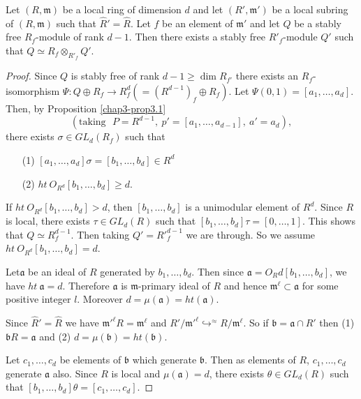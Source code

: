 \begin{proposition}\label{chap3-prop3.3}
Let $(R,\mathfrak{m})$ be a local ring of dimension $d$ and let
$(R',\mathfrak{m}')$ be a local subring of $(R,\mathfrak{m})$ such
that $\widehat{R}'=\widehat{R}$. Let $f$ be an element of
$\mathfrak{m}'$ and let $Q$ be a stably free $R_{f}$-module of rank
$d-1$. Then there exists a stably free $R'_{f}$-module $Q'$ such that
$Q\simeq R_{f}\otimes_{R'_{f}}Q'$. 
\end{proposition}

\begin{proof}
Since $Q$ is stably free of rank $d-1\geq \dim R_{f'}$ there exists an
$R_{f}$-isomorphism $\Psi:Q\oplus R_{f}\to
R^{d}_{f}(=(R^{d-1})_{f}\oplus R_{f})$. Let
$\Psi(0,1)=[a_{1},\ldots,a_{d}]$. Then, by
Proposition \ref{chap3-prop3.1}
$$ 
(\text{taking~ } P=R^{d-1}, \ 
p'=[a_{1},\ldots,a_{d-1}], \ a'=a_{d}),
$$ 
there exists $\sigma\in
GL_{d}(R_{f})$ such that
\begin{itemize}
\item[(1)] $[a_{1},\ldots,a_{d}]\sigma=[b_{1},\ldots,b_{d}]\in R^{d}$

\item[(2)] $ht\ O_{R^{d}}[b_{1},\ldots,b_{d}]\geq d$.
\end{itemize}
If $ht\ O_{R^{d}}[b_{1},\ldots,b_{d}]>d$, then $[b_{1},\ldots,b_{d}]$
is a unimodular element of $R^{d}$. Since $R$ is local, there exists
$\tau\in GL_{d}(R)$ such that
$[b_{1},\ldots,b_{d}]\tau=[0,\ldots,1]$. This shows that $Q\simeq
R^{d-1}_{f}$. Then taking $Q'={R'}^{d-1}_{f}$ we are through. So we
assume $ht\ O_{R^{d}}[b_{1},\ldots,b_{d}]=d$.

Let\pageoriginale $\mathfrak{a}$ be an ideal of $R$ generated by
$b_{1},\ldots,b_{d}$. Then since
$\mathfrak{a}=O_{R}d[b_{1},\ldots,b_{d}]$, we have
$ht\ \mathfrak{a}=d$. Therefore $\mathfrak{a}$ is
$\mathfrak{m}$-primary ideal of $R$ and hence
$\mathfrak{m}^{\ell}\subset \mathfrak{a}$ for some positive integer
$l$. Moreover $d=\mu(\mathfrak{a})=ht(\mathfrak{a})$. 

Since $\widehat{R}'=\widehat{R}$ we have
${\mathfrak{m}'}^{\ell}R=\mathfrak{m}^{\ell}$ and
$R'/{\mathfrak{m}'}^{\ell}{\displaystyle{\mathop{\hookrightarrow}^{\approx}}}
R/\mathfrak{m}^{\ell}$. So if $\mathfrak{b}=\mathfrak{a}\cap R'$ then
(1) $\mathfrak{b}R=\mathfrak{a}$ and (2)
$d=\mu(\mathfrak{b})=ht(\mathfrak{b})$. 

Let $c_{1},\ldots,c_{d}$ be elements of $\mathfrak{b}$ which generate
$\mathfrak{b}$. Then as elements of $R$, $c_{1},\ldots,c_{d}$ generate
$\mathfrak{a}$ also. Since $R$ is local and $\mu(\mathfrak{a})=d$,
there exists $\theta\in GL_{d}(R)$ such that
$[b_{1},\ldots,b_{d}]\theta=[c_{1},\ldots,c_{d}]$. 


\end{proof}
